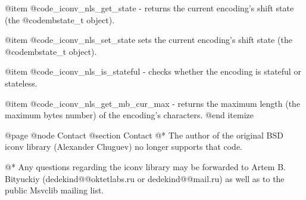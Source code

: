 @item
@code{_iconv_nls_get_state} - returns the current encoding's shift state
(the @code{mbstate_t} object).

@item
@code{_iconv_nls_set_state} sets the current encoding's shift state (the
@code{mbstate_t} object).

@item
@code{_iconv_nls_is_stateful} - checks whether the encoding is stateful
or stateless.

@item
@code{_iconv_nls_get_mb_cur_max} - returns the maximum length (the
maximum bytes number) of the encoding's characters.
@end itemize




@page
@node Contact
@section Contact
@*
The author of the original BSD iconv library (Alexander Chuguev) no longer
supports that code.

@*
Any questions regarding the iconv library may be forwarded to
Artem B. Bityuckiy (dedekind@@oktetlabs.ru or dedekind@@mail.ru) as
well as to the public Msvclib mailing list.

